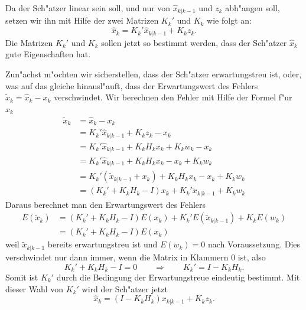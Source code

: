 Da der Sch"atzer linear sein soll, und nur von $\hat x_{k|k-1}$ und $z_{k}$
abh"angen soll, setzen wir ihn mit Hilfe der zwei Matrizen $K_k'$ und $K_k$
wie folgt an:
\[
\hat x_{k}=K_{k}' \hat x_{k|k-1}+K_{k} z_{k}.
\]
Die Matrizen $K_{k}'$ und $K_{k}$ sollen jetzt so bestimmt werden, dass der Sch"atzer
$\hat x_{k}$ gute Eigenschaften hat.

Zun"achst m"ochten wir sicherstellen, dass der Sch"atzer erwartungstreu ist,
oder, was auf das gleiche hinausl"auft, dass der Erwartungswert des Fehlers
$\tilde x_{k}=\hat x_{k}-x_{k}$ verschwindet. Wir berechnen den Fehler
mit Hilfe der Formel f"ur $\hat x_{k}$
\begin{align*}
\tilde x_{k}&=\hat x_{k}-x_{k}\\
&=K_{k}'\hat x_{k|k-1}+K_{k}z_{k}-x_{k}\\
&=K_{k}'\hat x_{k|k-1}+K_{k}H_{k}x_{k} + K_{k}w_{k}-x_{k}\\
&=K_{k}'\hat x_{k|k-1}+K_{k}H_{k}x_{k} -x_{k} + K_{k}w_{k}\\
&=K_{k}'(\tilde x_{k|k-1}+x_{k})+K_{k}H_{k}x_{k}-x_{k}+K_{k}w_{k}\\
&=(K_{k}'+K_{k}H_{k}-I)x_{k}+K_{k}'\tilde x_{k|k-1}+K_kw_k
\end{align*}
Daraus berechnet man den Erwartungswert des Fehlers
\begin{align*}
E(\tilde x_{k})&=(K_{k}'+K_{k}H_{k}-I)E(x_{k})+K_{k}'E(\tilde x_{k|k-1})+K_{k}E(w_{k})\\
&=(K_{k}'+K_{k}H_{k}-I)E(x_{k})
\end{align*}
weil $\tilde x_{k|k-1}$ bereits erwartungstreu ist und $E(w_{k})=0$ nach Voraussetzung.
Dies verschwindet nur dann immer, wenn die Matrix in Klammern $0$ ist,
also
\[
K_{k}'+K_{k}H_{k}-I=0\qquad\Rightarrow\qquad K_{k}'=I-K_{k}H_{k}.
\]
Somit ist $K_{k}'$ durch die Bedingung der Erwartungstreue eindeutig bestimmt.
Mit dieser Wahl von $K_{k}'$ wird der Sch"atzer jetzt
\[
\hat x_{k}=(I-K_{k}H_{k})x_{k|k-1}+K_{k}z_{k}.
\]

